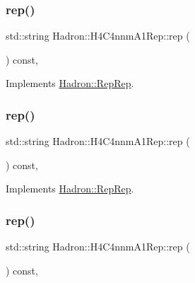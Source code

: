 \subsubsection{\texorpdfstring{rep()}{rep()}\hspace{0.1cm}{\footnotesize\ttfamily [1/3]}}
{\footnotesize\ttfamily std\+::string Hadron\+::\+H4\+C4nnm\+A1\+Rep\+::rep (\begin{DoxyParamCaption}{ }\end{DoxyParamCaption}) const\hspace{0.3cm}{\ttfamily [inline]}, {\ttfamily [virtual]}}



Implements \mbox{\hyperlink{structHadron_1_1RepRep_ab3213025f6de249f7095892109575fde}{Hadron\+::\+Rep\+Rep}}.

\mbox{\label{structHadron_1_1H4C4nnmA1Rep_a1284b0ca578df221e5280750522ab4b2}} 
\subsubsection{\texorpdfstring{rep()}{rep()}\hspace{0.1cm}{\footnotesize\ttfamily [2/3]}}
{\footnotesize\ttfamily std\+::string Hadron\+::\+H4\+C4nnm\+A1\+Rep\+::rep (\begin{DoxyParamCaption}{ }\end{DoxyParamCaption}) const\hspace{0.3cm}{\ttfamily [inline]}, {\ttfamily [virtual]}}



Implements \mbox{\hyperlink{structHadron_1_1RepRep_ab3213025f6de249f7095892109575fde}{Hadron\+::\+Rep\+Rep}}.

\mbox{\label{structHadron_1_1H4C4nnmA1Rep_a1284b0ca578df221e5280750522ab4b2}} 
\subsubsection{\texorpdfstring{rep()}{rep()}\hspace{0.1cm}{\footnotesize\ttfamily [3/3]}}
{\footnotesize\ttfamily std\+::string Hadron\+::\+H4\+C4nnm\+A1\+Rep\+::rep (\begin{DoxyParamCaption}{ }\end{DoxyParamCaption}) const\hspace{0.3cm}{\ttfamily [inline]}, {\ttfamily [virtual]}}



